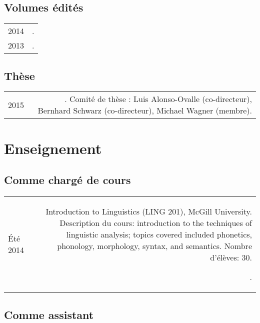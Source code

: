 \documentclass[11pt,a4paper,twoside,french]{article}
\makeatletter
\newcommand{\bodywidth}{0.77}
\newenvironment{cvsection}{%
  \setlength{\extrarowheight}{0.70ex}
  \begin{longtable}[l]{@{} L R @{}}
}{%
  \end{longtable}
}
\newcommand{\course}[3]{%
  \parbox[t]{\bodywidth\textwidth}{#1.\\ {\footnotesize Description du cours: #2.
      Nombre d'élèves: #3.}}
}
\makeatother
\begin{document}
\subsection*{Volumes édités}

\begin{cvsection}
  2014 & .\\
  2013 & .\\
\end{cvsection}

\subsection*{Thèse}

\begin{cvsection}
  2015 & . Comité de thèse : Luis Alonso-Ovalle (co-directeur), Bernhard Schwarz (co-directeur), Michael Wagner (membre).\\
\end{cvsection}

\section*{Enseignement}

\subsection*{Comme chargé de cours}

\begin{cvsection}
  Été 2014 & \course{Introduction to Linguistics (LING 201), McGill University}
  {introduction to the techniques of linguistic analysis; topics covered included phonetics, phonology, morphology, syntax, and semantics}
  {30}.
\end{cvsection}

\subsection*{Comme assistant}
\end{document}
